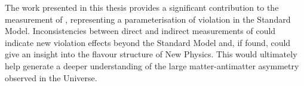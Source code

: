 The work presented in this thesis provides a significant contribution to the measurement of \Pgamma, representing a parameterisation of \CP violation in the Standard Model. Inconsistencies between direct and indirect measurements of \Pgamma could indicate new \CP violation effects beyond the Standard Model and, if found, could give an insight into the flavour structure of New Physics. This would ultimately help generate a deeper understanding of the large matter-antimatter asymmetry observed in the Universe.
